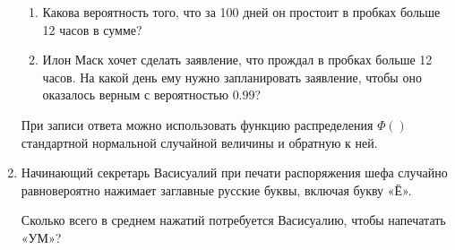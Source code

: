 \documentclass[12pt]{article}
\begin{document}
\begin{enumerate}
  \begin{enumerate}
    \item Какова вероятность того, что за 100 дней он простоит в пробках больше 12 часов в сумме?
    \item Илон Маск хочет сделать заявление, что прождал в пробках больше 12 часов. 
    На какой день ему нужно запланировать заявление, чтобы оно оказалось верным с вероятностью $0.99$?
  \end{enumerate}
  

  При записи ответа можно использовать функцию распределения $\Phi()$ стандартной нормальной случайной величины
  и обратную к ней. 




  

  \item Начинающий секретарь Васисуалий при печати распоряжения шефа случайно 
  равновероятно нажимает заглавные русские буквы, включая букву «Ё».
  
  Сколько всего в среднем нажатий потребуется Васисуалию, чтобы напечатать «УМ»?
\end{enumerate}
\end{document}

